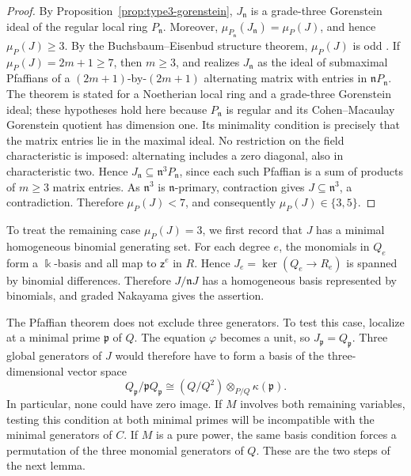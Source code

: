 \documentclass[10pt]{amsart}
\theoremstyle{plain}
\begin{document}
\begin{proof}
By Proposition~\ref{prop:type3-gorenstein},
\(J_{\mathfrak n}\) is a grade-three Gorenstein ideal of the regular
local ring \(P_{\mathfrak n}\).  Moreover,
\(\mu_{P_{\mathfrak n}}(J_{\mathfrak n})=\mu_P(J)\), and hence
\(\mu_P(J)\ge3\).  By the Buchsbaum--Eisenbud structure theorem,
\(\mu_P(J)\) is odd \cite[Corollary~2.2]{BE77}.  If
\(\mu_P(J)=2m+1\ge7\), then \(m\ge3\), and
\cite[Theorem~2.1]{BE77} realizes \(J_{\mathfrak n}\) as the ideal
of submaximal Pfaffians of a \((2m+1)\)-by-\((2m+1)\) alternating
matrix with entries in \(\mathfrak nP_{\mathfrak n}\).
The theorem is stated for a Noetherian local ring and a grade-three
Gorenstein ideal; these hypotheses hold here because \(P_{\mathfrak n}\)
is regular and its Cohen--Macaulay Gorenstein quotient has dimension
one.  Its minimality condition is precisely that the matrix entries
lie in the maximal ideal.  No restriction on the field characteristic
is imposed: alternating includes a zero diagonal, also in
characteristic two.  Hence
\(J_{\mathfrak n}\subseteq\mathfrak n^3P_{\mathfrak n}\), since each
such Pfaffian is a sum of products of \(m\ge3\) matrix entries.
As \(\mathfrak n^3\) is \(\mathfrak n\)-primary, contraction gives
\(J\subseteq\mathfrak n^3\), a contradiction.  Therefore
\(\mu_P(J)<7\), and consequently
\(\mu_P(J)\in\{3,5\}\).
\end{proof}

To treat the remaining case \(\mu_P(J)=3\), we first record that
\(J\) has a minimal homogeneous binomial generating set.  For each
degree \(e\), the monomials in \(Q_e\) form a \(\Bbbk\)-basis and all
map to \(\mathsf z^e\) in \(R\).  Hence
\(J_e=\ker(Q_e\to R_e)\) is spanned by binomial differences.
Therefore \(J/\mathfrak nJ\) has a homogeneous basis represented by
binomials, and graded Nakayama gives the assertion.

The Pfaffian theorem does not exclude three generators.  To test this
case, localize at a minimal prime \(\mathfrak p\) of \(Q\).
The equation \(\varphi\) becomes a unit, so \(J_{\mathfrak p}=Q_{\mathfrak p}\).
Three global generators of \(J\) would therefore have to form a basis
of the three-dimensional vector space
\[
Q_{\mathfrak p}/\mathfrak pQ_{\mathfrak p}
 \cong(Q/Q^2)\otimes_{P/Q}\kappa(\mathfrak p).
\]
In particular, none could have zero image.  If \(M\) involves both
remaining variables, testing this condition at both minimal primes
will be incompatible with the minimal generators of \(C\).  If \(M\)
is a pure power, the same basis condition forces a permutation of the
three monomial generators of \(Q\).  These are the two steps of the
next lemma.
\end{document}
